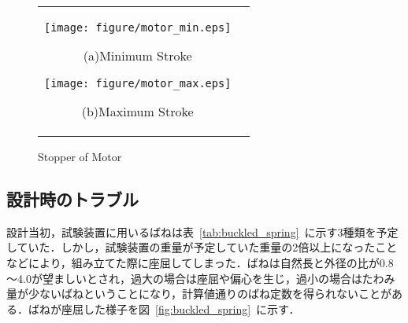 \documentclass[a4paper,12pt]{article_vdlab_sotsuron}
\begin{document}
\vspace*{10mm}
\begin{figure}[h!]
  \begin{tabular}{cc}
  \begin{minipage}{0.5\hsize}
  \begin{center} 
    \texttt{[image: figure/motor\_min.eps]}
    \end{center}
    \begin{center}
    \vspace{3mm}
    \ (a)Minimum Stroke\
    \end{center}
  \end{minipage}
  \begin{minipage}{0.5\hsize}
     \begin{center}
      \texttt{[image: figure/motor\_max.eps]}
      \end{center}
      \begin{center}
      \vspace{3mm}
      \ (b)Maximum Stroke\
    \end{center}
  \end{minipage}
  \end{tabular}
  \vspace*{3mm}
  \caption{Stopper of Motor}
    \label{fig:motor_stop}
 \end{figure}

\newpage
\subsection{設計時のトラブル}
設計当初，試験装置に用いるばねは表~\ref{tab:buckled_spring}~に示す3種類を予定していた．しかし，試験装置の重量が予定していた重量の2倍以上になったことなどにより，組み立てた際に座屈してしまった．ばねは自然長と外径の比が0.8～4.0が望ましいとされ，過大の場合は座屈や偏心を生じ，過小の場合はたわみ量が少ないばねということになり，計算値通りのばね定数を得られないことがある\cite{5}．ばねが座屈した様子を図~\ref{fig:buckled_spring}~に示す．
\end{document}
